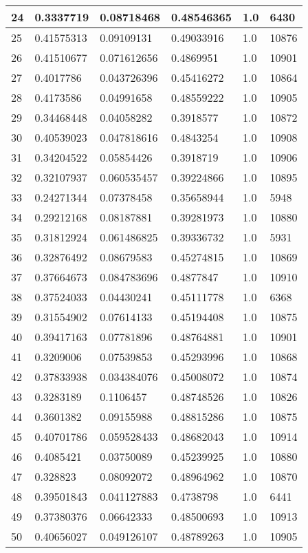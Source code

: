 \begin{longtable}{|l|l|l|l|l|l|}
24 & 0.3337719 & 0.08718468 & 0.48546365 & 1.0 & 6430 \\ \hline 
25 & 0.41575313 & 0.09109131 & 0.49033916 & 1.0 & 10876 \\ \hline 
26 & 0.41510677 & 0.071612656 & 0.4869951 & 1.0 & 10901 \\ \hline 
27 & 0.4017786 & 0.043726396 & 0.45416272 & 1.0 & 10864 \\ \hline 
28 & 0.4173586 & 0.04991658 & 0.48559222 & 1.0 & 10905 \\ \hline 
29 & 0.34468448 & 0.04058282 & 0.3918577 & 1.0 & 10872 \\ \hline 
30 & 0.40539023 & 0.047818616 & 0.4843254 & 1.0 & 10908 \\ \hline 
31 & 0.34204522 & 0.05854426 & 0.3918719 & 1.0 & 10906 \\ \hline 
32 & 0.32107937 & 0.060535457 & 0.39224866 & 1.0 & 10895 \\ \hline 
33 & 0.24271344 & 0.07378458 & 0.35658944 & 1.0 & 5948 \\ \hline 
34 & 0.29212168 & 0.08187881 & 0.39281973 & 1.0 & 10880 \\ \hline 
35 & 0.31812924 & 0.061486825 & 0.39336732 & 1.0 & 5931 \\ \hline 
36 & 0.32876492 & 0.08679583 & 0.45274815 & 1.0 & 10869 \\ \hline 
37 & 0.37664673 & 0.084783696 & 0.4877847 & 1.0 & 10910 \\ \hline 
38 & 0.37524033 & 0.04430241 & 0.45111778 & 1.0 & 6368 \\ \hline 
39 & 0.31554902 & 0.07614133 & 0.45194408 & 1.0 & 10875 \\ \hline 
40 & 0.39417163 & 0.07781896 & 0.48764881 & 1.0 & 10901 \\ \hline 
41 & 0.3209006 & 0.07539853 & 0.45293996 & 1.0 & 10868 \\ \hline 
42 & 0.37833938 & 0.034384076 & 0.45008072 & 1.0 & 10874 \\ \hline 
43 & 0.3283189 & 0.1106457 & 0.48748526 & 1.0 & 10826 \\ \hline 
44 & 0.3601382 & 0.09155988 & 0.48815286 & 1.0 & 10875 \\ \hline 
45 & 0.40701786 & 0.059528433 & 0.48682043 & 1.0 & 10914 \\ \hline 
46 & 0.4085421 & 0.03750089 & 0.45239925 & 1.0 & 10880 \\ \hline 
47 & 0.328823 & 0.08092072 & 0.48964962 & 1.0 & 10870 \\ \hline 
48 & 0.39501843 & 0.041127883 & 0.4738798 & 1.0 & 6441 \\ \hline 
49 & 0.37380376 & 0.06642333 & 0.48500693 & 1.0 & 10913 \\ \hline 
50 & 0.40656027 & 0.049126107 & 0.48789263 & 1.0 & 10905 \\ \hline 
\end{longtable}